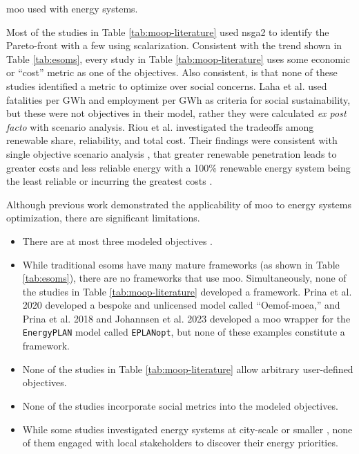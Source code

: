\begin{table}[ht!]
    \centering
    \caption{\ac{moo} used with energy systems.}
    \label{tab:moop-literature}
    \resizebox*{\textwidth}{!}{}
\end{table}
Most of the studies in Table \ref{tab:moop-literature} used \ac{nsga2} to
identify the Pareto-front with a few using scalarization. Consistent with the
trend shown in Table \ref{tab:esoms}, every study in Table
\ref{tab:moop-literature} uses some economic or ``cost'' metric as one of the
objectives. Also consistent, is that none of these studies identified a metric
to optimize over social concerns. Laha et al. \cite{laha_low_2021} used
fatalities per GWh and employment per GWh as criteria for social sustainability,
but these were not objectives in their model, rather they were calculated
\textit{ex post facto} with scenario analysis. Riou et al.
\cite{riou_multi-objective_2021} investigated the tradeoffs among renewable
share, reliability, and total cost. Their findings were consistent with single
objective scenario analysis \cite{de_sisternes_value_2016}, that greater
renewable penetration leads to greater costs and less reliable energy with a
100\% renewable energy system being the least reliable or incurring the greatest
costs \cite{riou_multi-objective_2021}. 

Although previous work demonstrated the applicability of \ac{moo} to energy
systems optimization, there are significant limitations. 
\begin{itemize}
    \item{There are at most three modeled objectives
    \cite{riou_multi-objective_2021,de-leon_almaraz_deployment_2015,
    de-leon_almaraz_assessment_2013}.}
    \item{While traditional \acp{esom} have many mature frameworks (as shown in
    Table \ref{tab:esoms}), there are no frameworks that use \ac{moo}.
    Simultaneously, none of the studies in Table \ref{tab:moop-literature}
    developed a framework. Prina et al. 2020 \cite{prina_multi-objective_2020}
    developed a bespoke and unlicensed model called ``Oemof-moea,'' and Prina et
    al. 2018 \cite{prina_multi-objective_2018} and Johannsen et al. 2023
    \cite{johannsen_municipal_2023} developed a \ac{moo} wrapper for the
    \texttt{EnergyPLAN} model called \texttt{EPLANopt}, but none of these
    examples constitute a framework.}
    \item{None of the studies in Table \ref{tab:moop-literature} allow arbitrary
    user-defined objectives.}
    \item{None of the studies incorporate social metrics into the modeled objectives.}
    \item{While some studies investigated energy systems at city-scale or
    smaller \cite{riou_multi-objective_2021,
    mayer_environmental_2020,fleischhacker_portfolio_2019,johannsen_municipal_2023},
    none of them engaged with local stakeholders to discover their energy
    priorities.}
\end{itemize}

